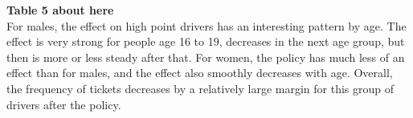 \textbf{Table 5 about here} \\

For males, the effect on high point drivers has an interesting pattern by age. The effect is very strong for people age 16 to 19, decreases in the next age group, but then is more or less steady after that. For women, the policy has much less of an effect than for males, and the effect also smoothly decreases with age. Overall, the frequency of tickets decreases by a relatively large margin for this group of drivers after the policy.




